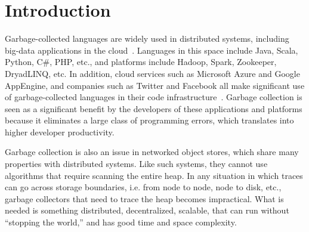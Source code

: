 \section{Introduction}

Garbage-collected languages are widely used in distributed systems, including big-data applications in the cloud~\cite{maas2015trash,gog2015broom}.  Languages  in this space include
Java, Scala, Python, C\#, PHP, etc., and platforms include Hadoop, Spark,
Zookeeper, DryadLINQ, etc. In addition, cloud services such as Microsoft Azure and
Google AppEngine, and companies such as Twitter and Facebook all make significant
use of garbage-collected languages in their code
infrastructure~\cite{maas2015trash}.  Garbage collection is seen as a
significant benefit by the developers of these applications and platforms
because it eliminates a large class of programming errors, which translates
into higher developer productivity.

Garbage collection is also an issue in networked object
stores, which share many properties with distributed systems. Like
such systems, they cannot use algorithms that require scanning the entire heap.
In any situation in which traces can go across storage boundaries, i.e. from
node to node, node to disk, etc., garbage collectors that need to trace the heap
becomes impractical.  What is needed is something distributed, decentralized, scalable,
that can run without ``stopping
the world,'' and has good time and space complexity.



